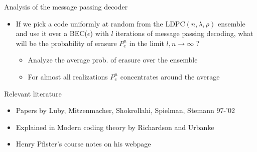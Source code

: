 \begin{frame}{Analysis of the message passing decoder}
\begin{block}{}
\begin{itemize}
  \item If we pick a code uniformly at random from the LDPC$(n,\lambda,\rho)$ ensemble and use it over a BEC($\epsilon$) with $l$ iterations of message passing decoding, what will be the probability of erasure $P_{e}^n$ in the limit $l,n \rightarrow \infty$ ?
      \pause
    \begin{itemize}
      \item Analyze the average prob. of erasure over the ensemble
      \item For almost all realizations $P_{e}^n$ concentrates around the average
    \end{itemize}
\end{itemize}
\end{block}
\pause
\begin{block}{Relevant literature}
\begin{itemize}
    \item Papers by Luby, Mitzenmacher, Shokrollahi, Spielman, Stemann 97-'02
    \item Explained in Modern coding theory by Richardson and Urbanke
    \item Henry Pfister's course notes on his webpage
\end{itemize}
\end{block}
\end{frame}
